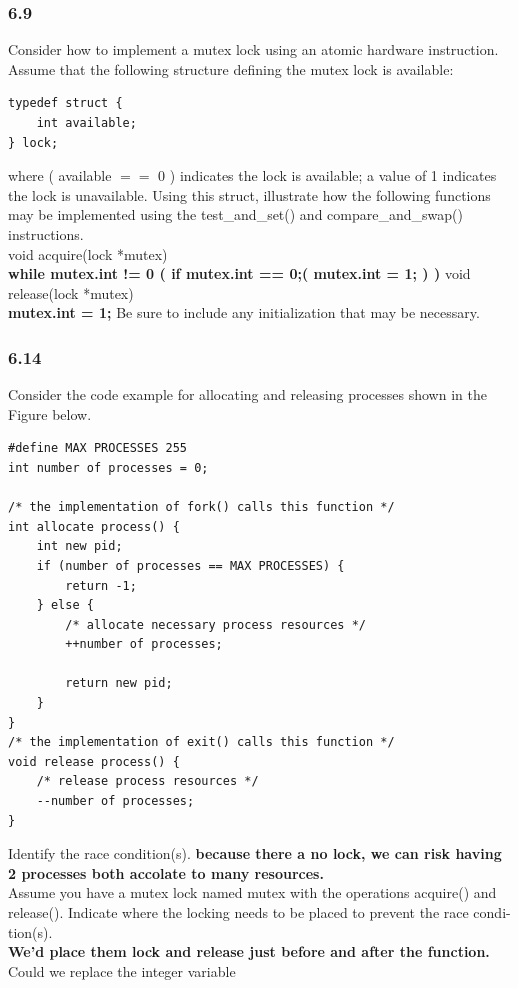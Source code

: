 \documentclass[a4paper,10pt,titlepage]{report}
\begin{document}
\subsubsection{6.9}
Consider how to implement a mutex lock using an atomic hardware instruction. Assume that the following structure defining the mutex lock is available:
\begin{lstlisting}[frame=single]
typedef struct {
    int available;
} lock;
\end{lstlisting}
where ( available $==$ 0 ) indicates the lock is available; a value of 1 indicates the lock is unavailable. Using this struct, illustrate how the following functions may be implemented using the test\_and\_set() and compare\_and\_swap() instructions.\\
void acquire(lock *mutex)\\
\textbf{
while mutex.int != 0 (
	if mutex.int == 0;(
	   mutex.int = 1;
	   )
	   )
}
void release(lock *mutex)\\
\textbf{mutex.int = 1;}
Be sure to include any initialization that may be necessary.\\
\subsubsection{6.14}
Consider the code example for allocating and releasing processes shown in the Figure below.
\begin{lstlisting}[frame=single]
#define MAX PROCESSES 255
int number of processes = 0;
 
/* the implementation of fork() calls this function */
int allocate process() {
    int new pid;
    if (number of processes == MAX PROCESSES) {
        return -1;
    } else {
        /* allocate necessary process resources */
        ++number of processes;
 
        return new pid;
    }
}
/* the implementation of exit() calls this function */
void release process() {
    /* release process resources */
    --number of processes;
}
\end{lstlisting}
Identify the race condition(s).
\textbf{because there a no lock, we can risk having 2 processes both accolate to many resources.} \\
Assume you have a mutex lock named mutex with the operations acquire() and release(). Indicate where the locking needs to be placed to prevent the race condi- tion(s). \\
\textbf{We'd place them lock and release just before and after the function.} \\
Could we replace the integer variable
\end{document}
